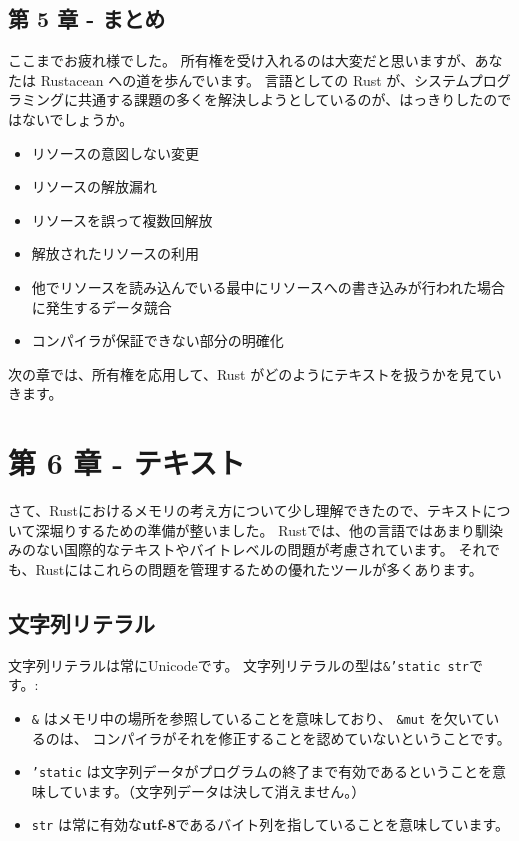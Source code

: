 \subsection{第 5 章 - まとめ}

ここまでお疲れ様でした。
所有権を受け入れるのは大変だと思いますが、あなたは Rustacean
への道を歩んでいます。 言語としての Rust
が、システムプログラミングに共通する課題の多くを解決しようとしているのが、はっきりしたのではないでしょうか。

\begin{itemize}
\item
  リソースの意図しない変更
\item
  リソースの解放漏れ
\item
  リソースを誤って複数回解放
\item
  解放されたリソースの利用
\item
  他でリソースを読み込んでいる最中にリソースへの書き込みが行われた場合に発生するデータ競合
\item
  コンパイラが保証できない部分の明確化
\end{itemize}

次の章では、所有権を応用して、Rust
がどのようにテキストを扱うかを見ていきます。

\section{第 6 章 - テキスト}

さて、Rustにおけるメモリの考え方について少し理解できたので、テキストについて深堀りするための準備が整いました。
Rustでは、他の言語ではあまり馴染みのない国際的なテキストやバイトレベルの問題が考慮されています。
それでも、Rustにはこれらの問題を管理するための優れたツールが多くあります。

\subsection{文字列リテラル}

文字列リテラルは常にUnicodeです。
文字列リテラルの型は\texttt{\&'static\ str}です。:

\begin{itemize}
\item
  \texttt{\&} はメモリ中の場所を参照していることを意味しており、
  \texttt{\&mut} を欠いているのは、
  コンパイラがそれを修正することを認めていないということです。
\item
  \texttt{'static}
  は文字列データがプログラムの終了まで有効であるということを意味しています。（文字列データは決して消えません。）
\item
  \texttt{str}
  は常に有効な\textbf{utf-8}であるバイト列を指していることを意味しています。
\end{itemize}

